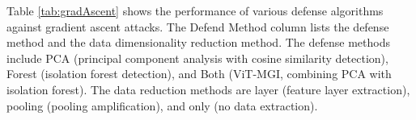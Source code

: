 \documentclass[conference]{IEEEtran}
\begin{document}





Table \hyperref[tab:gradAscent]{\ref{tab:gradAscent}} shows the performance of various defense algorithms against gradient ascent attacks. The Defend Method column lists the defense method and the data dimensionality reduction method. The defense methods include PCA (principal component analysis with cosine similarity detection), Forest (isolation forest detection), and Both (ViT-MGI, combining PCA with isolation forest). The data reduction methods are layer (feature layer extraction), pooling (pooling amplification), and only (no data extraction).
\end{document}
